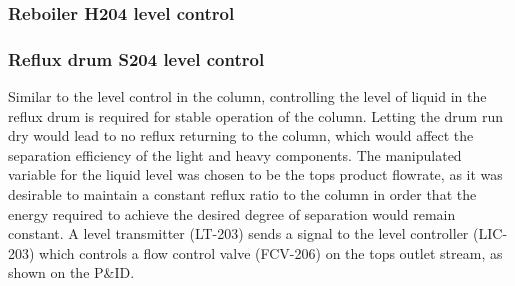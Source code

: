 





\subsubsection{Reboiler H204 level control} %


\subsubsection{Reflux drum S204 level control}%
Similar to the level control in the column, controlling the level of liquid in the reflux drum is required for stable operation of the column. Letting the drum run dry would lead to no reflux returning to the column, which would affect the separation efficiency of the light and heavy components. The manipulated variable for the liquid level was chosen to be the tops product flowrate, as it was desirable to maintain a constant reflux ratio to the column in order that the energy required to achieve the desired degree of separation would remain constant. A level transmitter (LT-203) sends a signal to the level controller (LIC-203) which controls a flow control valve (FCV-206) on the tops outlet stream, as shown on the P\&ID. 



